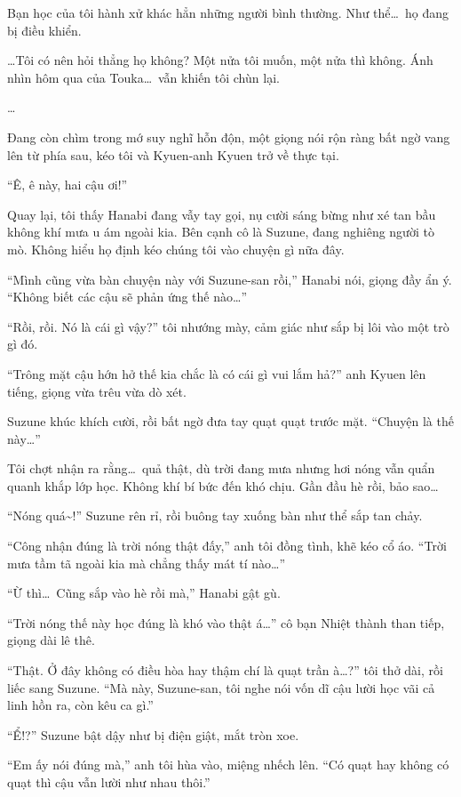 \documentclass[../main.tex]{subfiles}
\begin{document}
Bạn học của tôi hành xử khác hẳn những người bình thường. Như thể\dots\ họ đang bị điều khiển.

\dots Tôi có nên hỏi thẳng họ không? Một nửa tôi muốn, một nửa thì không. Ánh nhìn hôm qua của Touka\dots\ vẫn khiến tôi chùn lại.

\dots

Đang còn chìm trong mớ suy nghĩ hỗn độn, một giọng nói rộn ràng bất ngờ vang lên từ phía sau, kéo tôi và Kyuen-anh Kyuen trở về thực tại.

``Ê, ê này, hai cậu ơi!''

Quay lại, tôi thấy Hanabi đang vẫy tay gọi, nụ cười sáng bừng như xé tan bầu không khí mưa u ám ngoài kia. Bên cạnh cô là Suzune, đang nghiêng người tò mò. Không hiểu họ định kéo chúng tôi vào chuyện gì nữa đây.

``Mình cũng vừa bàn chuyện này với Suzune-san rồi,'' Hanabi nói, giọng đầy ẩn ý. ``Không biết các cậu sẽ phản ứng thế nào\dots''

``Rồi, rồi. Nó là cái gì vậy?'' tôi nhướng mày, cảm giác như sắp bị lôi vào một trò gì đó.

``Trông mặt cậu hớn hở thế kia chắc là có cái gì vui lắm hả?'' anh Kyuen lên tiếng, giọng vừa trêu vừa dò xét.

Suzune khúc khích cười, rồi bất ngờ đưa tay quạt quạt trước mặt. ``Chuyện là thế này\dots''

Tôi chợt nhận ra rằng\dots\ quả thật, dù trời đang mưa nhưng hơi nóng vẫn quẩn quanh khắp lớp học. Không khí bí bức đến khó chịu. Gần đầu hè rồi, bảo sao\dots

``Nóng quá\~{}!'' Suzune rên rỉ, rồi buông tay xuống bàn như thể sắp tan chảy.

``Công nhận đúng là trời nóng thật đấy,'' anh tôi đồng tình, khẽ kéo cổ áo. ``Trời mưa tầm tã ngoài kia mà chẳng thấy mát tí nào\dots''

``Ừ thì\dots\ Cũng sắp vào hè rồi mà,'' Hanabi gật gù.

``Trời nóng thế này học đúng là khó vào thật á\dots'' cô bạn Nhiệt thành than tiếp, giọng dài lê thê.

``Thật. Ở đây không có điều hòa hay thậm chí là quạt trần à\dots?'' tôi thở dài, rồi liếc sang Suzune. ``Mà này, Suzune-san, tôi nghe nói vốn dĩ cậu lười học vãi cả linh hồn ra, còn kêu ca gì.''

``Ể!?'' Suzune bật dậy như bị điện giật, mắt tròn xoe.

``Em ấy nói đúng mà,'' anh tôi hùa vào, miệng nhếch lên. ``Có quạt hay không có quạt thì cậu vẫn lười như nhau thôi.''
\end{document}
